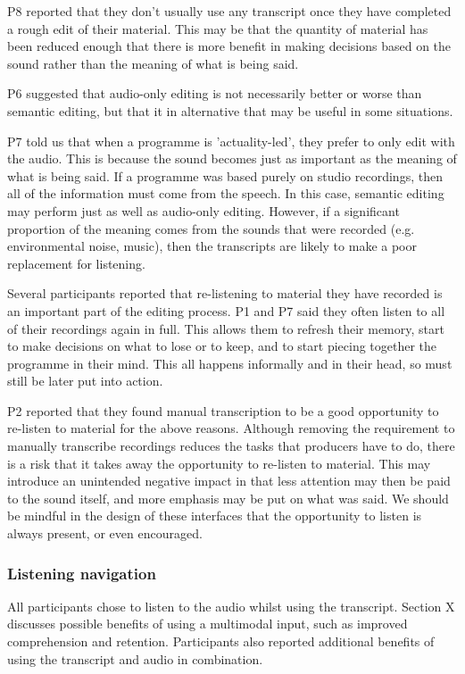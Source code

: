 P8 reported that they don't usually use any transcript once they have completed a rough edit of their material. This
may be that the quantity of material has been reduced enough that there is more benefit in making decisions based on
the sound rather than the meaning of what is being said.

P6 suggested that audio-only editing is not necessarily better or worse than semantic editing, but that it in
alternative that may be useful in some situations.

P7 told us that when a programme is 'actuality-led', they prefer to only edit with the audio. This is because the sound
becomes just as important as the meaning of what is being said. If a programme was based purely on studio recordings,
then all of the information must come from the speech. In this case, semantic editing may perform just as well as
audio-only editing. However, if a significant proportion of the meaning comes from the sounds that were recorded (e.g.
environmental noise, music), then the transcripts are likely to make a poor replacement for listening.

Several participants reported that re-listening to material they have recorded is an important part of the editing
process. P1 and P7 said they often listen to all of their recordings again in full. This allows them to refresh their
memory, start to make decisions on what to lose or to keep, and to start piecing together the programme in their mind.
This all happens informally and in their head, so must still be later put into action.

P2 reported that they found manual transcription to be a good opportunity to re-listen to material for the above
reasons. Although removing the requirement to manually transcribe recordings reduces the tasks that producers have to
do, there is a risk that it takes away the opportunity to re-listen to material. This may introduce an unintended
negative impact in that less attention may then be paid to the sound itself, and more emphasis may be put on what was
said. We should be mindful in the design of these interfaces that the opportunity to listen is always present, or even
encouraged.

\subsubsection{Listening navigation}

All participants chose to listen to the audio whilst using the transcript. Section X discusses possible benefits of
using a multimodal input, such as improved comprehension and retention. Participants also reported additional benefits
of using the transcript and audio in combination.

